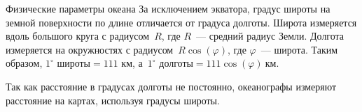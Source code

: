 \begin{chapter}{Физические параметры океана}
За исключением экватора, градус широты на земной поверхности по длине
отличается от градуса долготы. Широта измеряется вдоль 
большого круга с радиусом~$R$, где $R$~--- средний радиус Земли. Долгота
измеряется на окружностях с радиусом~$R \cos(\varphi)$, где $\varphi$~--- широта. 
Таким образом, $1^\circ\mbox{~широты} = 111\mbox{~км}$, 
а~$1^\circ\mbox{~долготы} = 111\cos(\varphi)~\mbox{км}$. 
%

Так как расстояние в градусах долготы не постоянно, океанографы
измеряют расстояние на картах, используя градусы широты.
%


\end{chapter}
